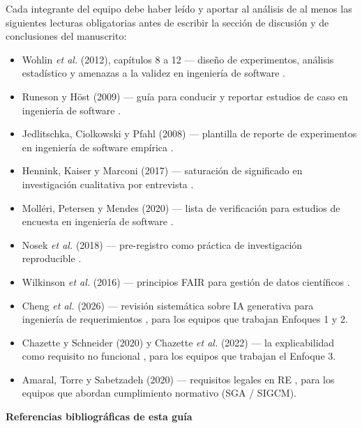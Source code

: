 \documentclass[11pt,a4paper]{article}
\newcounter{secc}
\newcommand{\secband}[1]{%
    \stepcounter{secc}\par\vspace{9pt}\noindent
    {\setlength{\fboxsep}{0pt}%
        \colorbox{uteqgold}{\parbox[c][20pt][c]{0.05\textwidth}{\centering\textbf{\color{white}\small \arabic{secc}}}}%
        \colorbox{uteqgreen}{\parbox[c][20pt][c]{0.95\textwidth}{\hspace{8pt}\textbf{\color{white}\small #1}}}%
    }\par\vspace{5pt}}
\begin{document}
Cada integrante del equipo debe haber leído y aportar al análisis de al menos las siguientes lecturas obligatorias antes de escribir la sección de discusión y de conclusiones del manuscrito:
\begin{itemize}
    \item Wohlin \emph{et al.} (2012), capítulos 8 a 12 --- diseño de experimentos, análisis estadístico y amenazas a la validez en ingeniería de software \cite{wohlin2012experimentation}.
    \item Runeson y Höst (2009) --- guía para conducir y reportar estudios de caso en ingeniería de software \cite{runeson2009guidelines}.
    \item Jedlitschka, Ciolkowski y Pfahl (2008) --- plantilla de reporte de experimentos en ingeniería de software empírica \cite{jedlitschka2008reporting}.
    \item Hennink, Kaiser y Marconi (2017) --- saturación de significado en investigación cualitativa por entrevista \cite{hennink2017saturation}.
    \item Molléri, Petersen y Mendes (2020) --- lista de verificación para estudios de encuesta en ingeniería de software \cite{molleri2020checklist}.
    \item Nosek \emph{et al.} (2018) --- pre-registro como práctica de investigación reproducible \cite{nosek2018preregistration}.
    \item Wilkinson \emph{et al.} (2016) --- principios FAIR para gestión de datos científicos \cite{wilkinson2016fair}.
    \item Cheng \emph{et al.} (2026) --- revisión sistemática sobre IA generativa para ingeniería de requerimientos \cite{cheng2026genai}, para los equipos que trabajan Enfoques 1 y 2.
    \item Chazette y Schneider (2020) y Chazette \emph{et al.} (2022) --- la explicabilidad como requisito no funcional \cite{chazette2020nfr,chazette2022explainable}, para los equipos que trabajan el Enfoque 3.
    \item Amaral, Torre y Sabetzadeh (2020) --- requisitos legales en RE \cite{amaral2020legal}, para los equipos que abordan cumplimiento normativo (SGA / SIGCM).
\end{itemize}

\secband{Referencias bibliográficas de esta guía}



\end{document}
